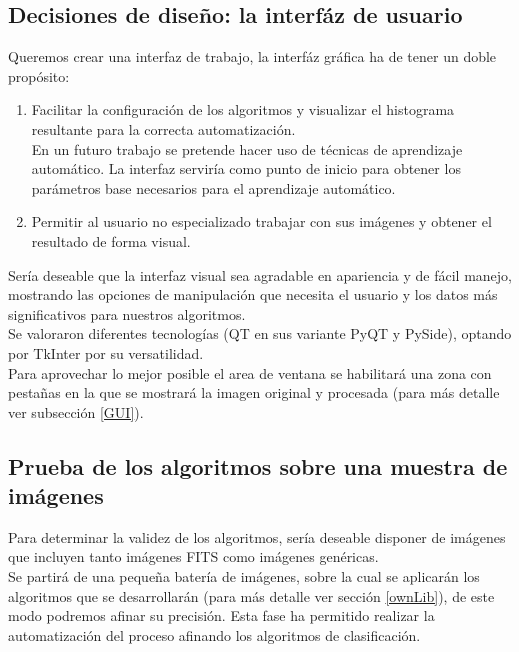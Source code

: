 	\subsection{Decisiones de diseño: la interfáz de usuario}
	Queremos crear una interfaz de trabajo, la interfáz gráfica ha de tener un doble propósito:
	\begin{enumerate}
		\item Facilitar la configuración de los algoritmos y visualizar el histograma resultante para la correcta automatización.\\ En un futuro trabajo se pretende hacer uso de técnicas de aprendizaje automático. La interfaz serviría como punto de inicio para obtener los parámetros base necesarios para el aprendizaje automático.
		\item Permitir al usuario no especializado trabajar con sus imágenes y obtener el resultado de forma visual.
	\end{enumerate}
	Sería deseable que la interfaz visual sea agradable en apariencia y de fácil manejo, mostrando  las opciones de manipulación que necesita el usuario y los datos más significativos para  nuestros algoritmos.\\
	Se valoraron diferentes tecnologías (QT en sus variante PyQT y PySide), optando por TkInter por su versatilidad.\\
	Para aprovechar lo mejor posible el area de ventana se habilitará una zona con pestañas en la que se mostrará la imagen original y procesada (para más detalle ver subsección \ref{GUI}).
	
	\subsection{Prueba de los algoritmos sobre una muestra de imágenes}
	Para determinar la validez de los algoritmos, sería deseable disponer de imágenes que incluyen tanto imágenes FITS como imágenes genéricas.\\
	Se partirá de una pequeña batería de imágenes, sobre la cual se aplicarán los algoritmos que se desarrollarán (para más detalle ver sección \ref{ownLib}), de este modo podremos afinar su precisión.
	Esta fase ha permitido realizar la automatización del proceso afinando los algoritmos de clasificación.

